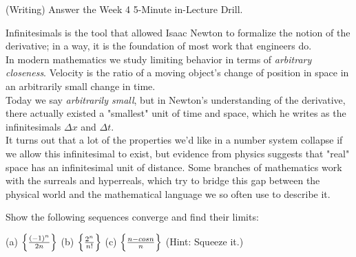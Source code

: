 \documentclass[11 pt]{article}
\begin{document}
\pagebreak
\begin{problem}
	(Writing) Answer the Week 4 5-Minute in-Lecture Drill.
\end{problem}
\begin{solution}
	Infinitesimals is the tool that allowed Isaac Newton to formalize the notion of the derivative; in a way, it is the foundation of most work that engineers do.\\
	In modern mathematics we study limiting behavior in terms of \emph{arbitrary closeness}. Velocity is the ratio of a moving object's change of position in space in an arbitrarily small change in time. \\
	Today we say \emph{arbitrarily small}, but in Newton's understanding of the derivative, there actually existed a "smallest" unit of time and space, which he writes as the infinitesimals $\Delta x$ and $\Delta t$.\\
	It turns out that a lot of the properties we'd like in a number system collapse if we allow this infinitesimal to exist, but evidence from physics suggests that "real" space has an infinitesimal unit of distance. Some branches of mathematics work with the surreals and hyperreals, which try to bridge this gap between the physical world and the mathematical language we so often use to describe it.
\end{solution}
\pagebreak
\begin{problem}
Show the following sequences converge and find their limits:\\
\begin{center}
(a) $\Bigl\{\frac{(-1)^n}{2n}\Bigr\}$ (b) $\Bigl\{\frac{2^n}{n!}\Bigr\}$ (c) $\Bigl\{\frac{n-cosn}{n}\Bigr\}$ (Hint: Squeeze it.)
\end{center}
\end{problem}
\end{document}
